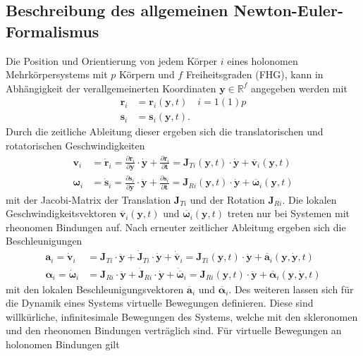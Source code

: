 \subsection{Beschreibung des allgemeinen Newton-Euler-Formalismus}
Die Position und Orientierung von jedem Körper $i$ eines holonomen Mehrkörpersystems mit $p$ Körpern und $f$ Freiheitsgraden (FHG), kann in Abhängigkeit der verallgemeinerten Koordinaten $\pmb{y}\in \mathbb{R}^f$ angegeben werden mit
\begin{align}
\pmb{r}_i &= \pmb{r}_i(\pmb{y},t)\quad i = 1(1)p\\
\pmb{s}_i &= \pmb{s}_i(\pmb{y},t).
\end{align}
Durch die zeitliche Ableitung dieser ergeben sich die translatorischen und rotatorischen Geschwindigkeiten
\begin{align}\label{vi}
\pmb{v}_i &=  \dot{\pmb{r}}_i = \frac{\partial\pmb{r}_i}{\partial\pmb{y}}\cdot \dot{\pmb{y}} + \frac{\partial\pmb{r}_i}{\partial\pmb{t}} = \pmb{J}_{Ti}(\pmb{y},t)\cdot \dot{\pmb{y}} + \overline{\pmb{v}}_i(\pmb{y},t)\\\label{omegai}
\pmb{\omega}_i &=  \dot{\pmb{s}}_i = \frac{\partial\pmb{s}_i}{\partial\pmb{y}}\cdot \dot{\pmb{y}} + \frac{\partial\pmb{s}_i}{\partial\pmb{t}} = \pmb{J}_{Ri}(\pmb{y},t)\cdot \dot{\pmb{y}} + \overline{\pmb{\omega}}_i(\pmb{y},t)
\end{align}
mit der Jacobi-Matrix der Translation $\pmb{J}_{Ti}$ und der Rotation $\pmb{J}_{Ri}$. Die lokalen Geschwindigkeitsvektoren $\overline{\pmb{v}}_i(\pmb{y},t)$ und $\overline{\pmb{\omega}}_i(\pmb{y},t)$ treten nur bei Systemen mit rheonomen Bindungen auf. Nach erneuter zeitlicher Ableitung ergeben sich die Beschleunigungen 
\begin{align}
\pmb{a}_i = \dot{\pmb{v}}_i &= \pmb{J}_{Ti} \cdot \ddot{\pmb{y}} + \dot{\pmb{J}}_{Ti} \cdot \dot{\pmb{y}} + \dot{\overline{\pmb{v}}}_i = \pmb{J}_{Ti}(\pmb{y},t) \cdot \ddot{\pmb{y}} + \overline{\pmb{a}}_i(\pmb{y},\dot{\pmb{y}},t)\\
\pmb{\alpha}_i = \dot{\pmb{\omega}}_i &= \pmb{J}_{Ri} \cdot \ddot{\pmb{y}} + \dot{\pmb{J}}_{Ri} \cdot \dot{\pmb{y}} + \dot{\overline{\pmb{\omega}}}_i = \pmb{J}_{Ri}(\pmb{y},t) \cdot \ddot{\pmb{y}} + \overline{\pmb{\alpha}}_i(\pmb{y},\dot{\pmb{y}},t)\label{alphai}
\end{align}
mit den lokalen Beschleunigungsvektoren $\overline{\pmb{a}}_i$ und $ \overline{\pmb{\alpha}}_i$. 
Des weiteren lassen sich für die Dynamik eines Systems virtuelle Bewegungen definieren. Diese sind willkürliche, infinitesimale Bewegungen des Systems, welche mit den skleronomen und den rheonomen Bindungen verträglich sind. Für virtuelle Bewegungen an holonomen Bindungen gilt
